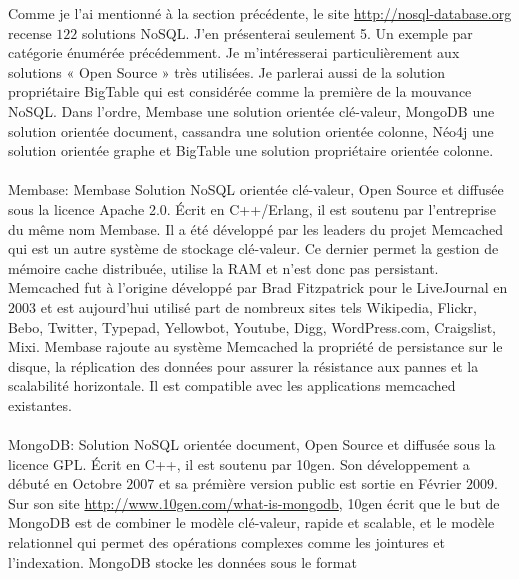 Comme je l'ai mentionné à la section précédente, le
site \url{http://nosql-database.org} recense $122$
solutions \textsf{NoSQL}.  J'en présenterai seulement 5. Un exemple
par catégorie énumérée précédemment. Je m'intéresserai
particulièrement aux solutions « \textsf{Open Source} » très
utilisées. Je parlerai aussi de la solution propriétaire \textsf{BigTable}
qui est considérée comme la première de la
mouvance \textsf{NoSQL}. Dans l'ordre, \textsf{Membase} une solution
orientée \textsf{clé-valeur}, \textsf{MongoDB} une solution
orientée \textsf{document}, \textsf{cassandra} une solution
orientée \textsf{colonne}, \textsf{Néo4j} une solution
orientée \textsf{graphe} et \textsf{BigTable} une solution
propriétaire orientée \textsf{colonne}.
\\
\\
\textsf{Membase}: \textsf{Membase} Solution \textsf{NoSQL} orientée \textsf{clé-valeur}, Open Source et diffusée sous la licence Apache 2.0. Écrit en \textsf{C++/Erlang}, il est soutenu par l'entreprise du même nom \textsf{Membase}\cite{RickCattell}. Il a été développé par les leaders du projet \textsf{Memcached} qui est un
autre système de stockage \textsf{clé-valeur}. Ce dernier permet la
gestion de mémoire cache distribuée, utilise la \textsf{RAM} et n'est
donc pas persistant. \textsf{Memcached} fut à l'origine développé
par \textsf{Brad Fitzpatrick} pour le \textsf{LiveJournal} en $2003$
et est aujourd'hui utilisé part de nombreux sites
tels \textsf{Wikipedia, Flickr, Bebo, Twitter, Typepad, Yellowbot,
Youtube, Digg, WordPress.com, Craigslist,
Mixi}\cite{memcached}. \textsf{Membase}
rajoute au système \textsf{Memcached} la propriété de persistance sur
le disque, la réplication des données pour assurer la résistance aux
pannes et la scalabilité horizontale. Il est compatible avec les applications memcached existantes.
\\
\\ 
{\sf MongoDB}:  Solution \textsf{NoSQL} orientée \textsf{document},
Open Source et diffusée sous la licence \textsf{GPL}. Écrit
en \textsf{C++}, il est soutenu
par \textsf{10gen}\cite{RickCattell}. Son développement a débuté en Octobre $2007$ et sa prémière version public est sortie en Février $2009$\cite{blogmongodb}. Sur son
site \url{http://www.10gen.com/what-is-mongodb}, \textsf{10gen} écrit
que le but de \textsf{MongoDB} est de combiner le
modèle \textsf{clé-valeur}, rapide et scalable, et le modèle
relationnel qui permet des opérations complexes comme les jointures et
l'indexation. \textsf{MongoDB} stocke les données sous le format
